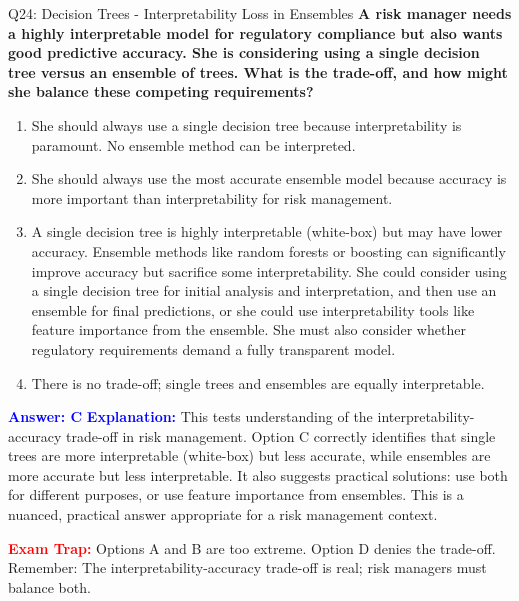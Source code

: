\documentclass[8pt]{beamer}
\begin{document}
	\begin{frame}{Q24: Decision Trees - Interpretability Loss in Ensembles}
		\fontsize{6.5}{7.5}\selectfont
		\textbf{A risk manager needs a highly interpretable model for regulatory compliance but also wants good predictive accuracy. She is considering using a single decision tree versus an ensemble of trees. What is the trade-off, and how might she balance these competing requirements?}
		
		\begin{enumerate}
			\item She should always use a single decision tree because interpretability is paramount. No ensemble method can be interpreted.
			\item She should always use the most accurate ensemble model because accuracy is more important than interpretability for risk management.
			\item A single decision tree is highly interpretable (white-box) but may have lower accuracy. Ensemble methods like random forests or boosting can significantly improve accuracy but sacrifice some interpretability. She could consider using a single decision tree for initial analysis and interpretation, and then use an ensemble for final predictions, or she could use interpretability tools like feature importance from the ensemble. She must also consider whether regulatory requirements demand a fully transparent model.
			\item There is no trade-off; single trees and ensembles are equally interpretable.
		\end{enumerate}
		
		\vspace{0.1cm}
		\textcolor{blue}{\textbf{Answer: C}}
		\vspace{0.1cm}
		\textcolor{blue}{\textbf{Explanation:}} This tests understanding of the interpretability-accuracy trade-off in risk management. Option C correctly identifies that single trees are more interpretable (white-box) but less accurate, while ensembles are more accurate but less interpretable. It also suggests practical solutions: use both for different purposes, or use feature importance from ensembles. This is a nuanced, practical answer appropriate for a risk management context.
		
		\textcolor{red}{\textbf{Exam Trap:}} Options A and B are too extreme. Option D denies the trade-off. Remember: The interpretability-accuracy trade-off is real; risk managers must balance both.
	\end{frame}
	
\end{document}
